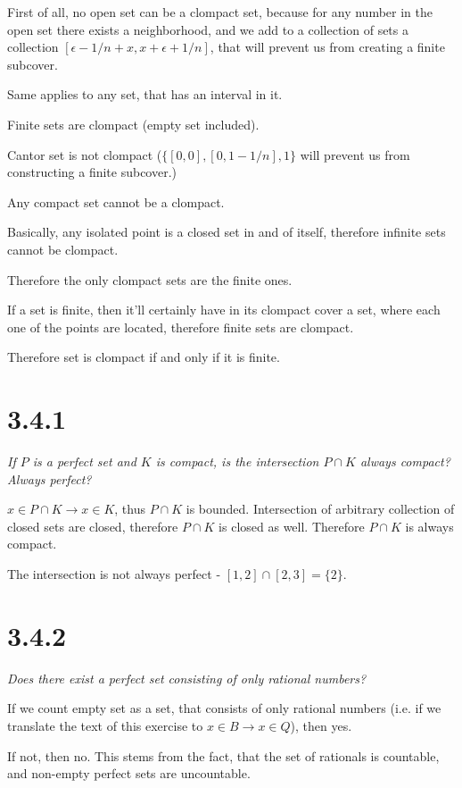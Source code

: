 \documentclass[11pt,oneside,titlepage]{book}
\begin{document}
First of all, no open set can be a clompact set, because for any number
in the open set there
exists a neighborhood, and we add to a collection of sets a collection
$[\epsilon - 1/n + x, x + \epsilon + 1/n]$, that will prevent us from
creating a finite subcover.

Same applies to any set, that has an interval in it.

Finite sets are clompact (empty set included).

Cantor set is not clompact
($\{[0, 0], [0, 1 - 1/n], 1 \}$ will prevent us from constructing a finite
subcover.)

Any compact set cannot be a clompact.

Basically, any isolated point is a closed set in and of itself, therefore
infinite sets cannot be clompact.

Therefore the only clompact sets are the finite ones.

If a set is finite, then it'll certainly have in its clompact cover a set, where
each one of the points are located, therefore finite sets are clompact.

Therefore set is clompact if and only if it is finite.


\section*{3.4.1}
\textit{If $P$ is a perfect set and $K$ is compact, is the intersection
  $P \cap K$ always compact? Always perfect?}

$x \in P \cap K \to x \in K$, thus $P \cap K$ is bounded. Intersection of
arbitrary collection of closed sets are closed, therefore $P \cap K$ is
closed as well. Therefore $P \cap K$ is always compact.

The intersection is not always perfect - $[1, 2] \cap [2, 3] = \{2\}$.

\section*{3.4.2}
\textit{Does there exist a perfect set consisting of only rational numbers?}

If we count empty set as a set, that consists of only rational numbers
(i.e. if we translate the text of this exercise to $x \in B \to x \in Q$),
then yes.

If not, then no. This stems from the fact, that the set of rationals is
countable, and non-empty perfect sets are uncountable.
\end{document}
